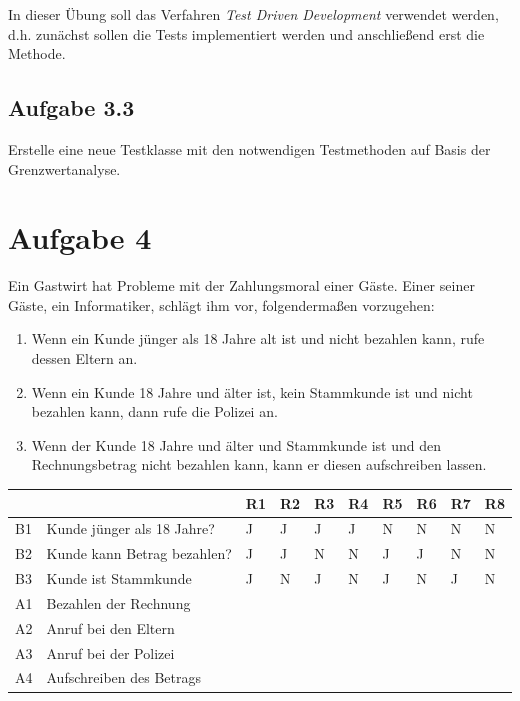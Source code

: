 In dieser Übung soll das Verfahren \textit{Test Driven Development} verwendet werden, d.h. zunächst sollen die Tests implementiert werden und anschließend erst die Methode.

\subsection*{Aufgabe 3.3}
Erstelle eine neue Testklasse mit den notwendigen Testmethoden auf Basis der Grenzwertanalyse.

\newpage
\section*{Aufgabe 4}
Ein Gastwirt hat Probleme mit der Zahlungsmoral einer Gäste. Einer seiner Gäste, ein Informatiker, schlägt ihm vor, folgendermaßen vorzugehen:

\begin{enumerate}
\item Wenn ein Kunde jünger als 18 Jahre alt ist und nicht bezahlen kann, rufe dessen Eltern an.
\item Wenn ein Kunde 18 Jahre und älter ist, kein Stammkunde ist und nicht bezahlen kann, dann rufe die Polizei an.
\item Wenn der Kunde 18 Jahre und älter und Stammkunde ist und den Rechnungsbetrag nicht bezahlen kann, kann er diesen aufschreiben lassen.
\end{enumerate}

\begin{center}
\begin{tabular}{|l|l|l|l|l|l|l|l|l|l|}
\hline
 & & R1 & R2 & R3 & R4 & R5 & R6 & R7 & R8\\\hline \hline
B1 & Kunde jünger als 18 Jahre?  & J & J & J & J & N & N & N & N \\ \hline
B2 & Kunde kann Betrag bezahlen? & J & J & N & N & J & J & N & N \\ \hline 
B3 & Kunde ist Stammkunde        & J & N & J & N & J & N & J & N \\ \hline \hline
A1 & Bezahlen der Rechnung       &   &   &   &   &   &   &   &   \\ \hline 
A2 & Anruf bei den Eltern        &   &   &   &   &   &   &   &   \\ \hline
A3 & Anruf bei der Polizei       &   &   &   &   &   &   &   &   \\ \hline
A4 & Aufschreiben des Betrags    &   &   &   &   &   &   &   &   \\ \hline
\end{tabular}
\end{center}


